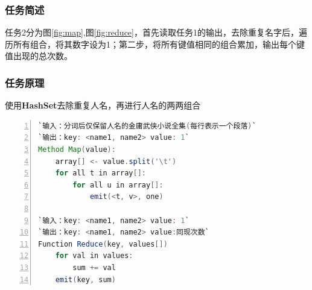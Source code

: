 \documentclass{ctexart}
\begin{document}
	\subsubsection{任务简述}
	\par 任务2分为图\ref{fig:map},图\ref{fig:reduce}，首先读取任务1的输出，去除重复名字后，遍历所有组合，将其数字设为1；第二步，将所有键值相同的组合累加，输出每个键值出现的总次数。

	\subsubsection{任务原理}
	\par 使用\textbf{HashSet}去除重复人名，再进行人名的两两组合
	\begin{lstlisting}[language=java, numbers=left, numberstyle=\tiny, frame=shadowbox, basicstyle=\ttfamily, escapeinside=``] 
`输入：分词后仅保留人名的金庸武侠小说全集(每行表示一个段落)`
`输出：key: <name1, name2> value: 1`
Method Map(value):
	array[] <- value.split('\t')
	for all t in array[]:
		for all u in array[]:
			emit(<t, v>, one) 

`输入：key: <name1, name2> value: 1`
`输出：key: <name1, name2> value:同现次数`
Function Reduce(key, values[])
	for val in values:
		sum += val
	emit(key, sum)
	\end{lstlisting}
	
\end{document}
